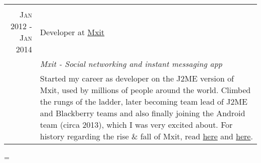 \documentclass[a4paper,10pt,notitlepage]{article}
\newenvironment{absolutelynopagebreak}
  {\par\nobreak\vfil\penalty0\vfilneg
   \vtop\bgroup}
  {\par\xdef\tpd{\the\prevdepth}\egroup
   \prevdepth=\tpd}
\begin{document}
\begin{absolutelynopagebreak}
\begin{tabular}{r|p{11cm}}
		\multicolumn{2}{c}{} \\
		\textsc{Jan 2012 - Jan 2014} & Developer at \href{www.mxit.com}{Mxit} \\
		                             & \emph{Mxit - Social networking and instant messaging app} \\
		                             & \footnotesize{Started my career as developer on the J2ME version of Mxit, used by millions of people around the world. Climbed the rungs of the ladder, later becoming team lead of J2ME and Blackberry teams and also finally joining the Android team (circa 2013), which I was very excited about. For history regarding the rise \& fall of Mxit, read \href{https://en.wikipedia.org/wiki/Mxit}{here} and \href{https://www.moneyweb.co.za/news/companies-and-deals/how-did-mxit-go-so-wrong/}{here}.} \\
		
	\end{tabular}
	
\end{absolutelynopagebreak}
\end{document}
